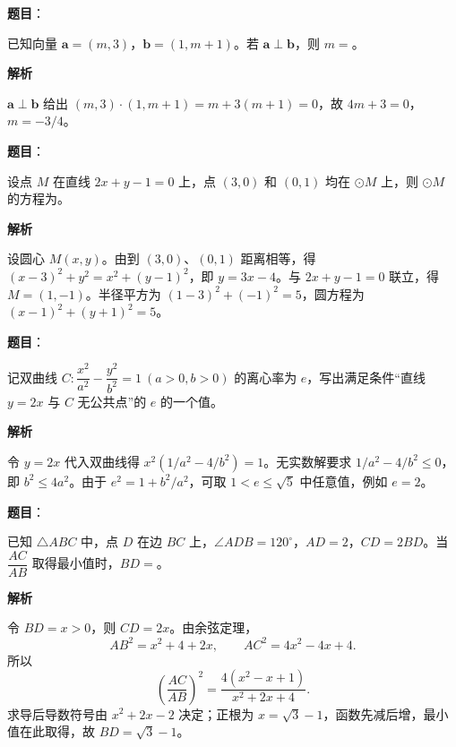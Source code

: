 \begin{answer}

\textbf{题目}：

已知向量 $\boldsymbol a=(m,3)$，$\boldsymbol b=(1,m+1)$。若 $\boldsymbol a\perp\boldsymbol b$，则 $m=$\gkblank{}。

\textbf{解析}

$\boldsymbol a\perp\boldsymbol b$ 给出
$(m,3)\cdot(1,m+1)=m+3(m+1)=0$，故 $4m+3=0$，$m=-3/4$。


\end{answer}
\begin{answer}

\textbf{题目}：

设点 $M$ 在直线 $2x+y-1=0$ 上，点 $(3,0)$ 和 $(0,1)$ 均在 $\odot M$ 上，则 $\odot M$ 的方程为\gkblank{}。

\textbf{解析}

设圆心 $M(x,y)$。由到 $(3,0)$、$(0,1)$ 距离相等，得
$(x-3)^2+y^2=x^2+(y-1)^2$，即 $y=3x-4$。与 $2x+y-1=0$ 联立，得 $M=(1,-1)$。半径平方为 $(1-3)^2+(-1)^2=5$，圆方程为 $(x-1)^2+(y+1)^2=5$。


\end{answer}
\begin{answer}

\textbf{题目}：

记双曲线 $C:\dfrac{x^2}{a^2}-\dfrac{y^2}{b^2}=1\ (a>0,b>0)$ 的离心率为 $e$，写出满足条件“直线 $y=2x$ 与 $C$ 无公共点”的 $e$ 的一个值\gkblank{}。

\textbf{解析}

令 $y=2x$ 代入双曲线得 $x^2(1/a^2-4/b^2)=1$。无实数解要求 $1/a^2-4/b^2\leq0$，即 $b^2\leq4a^2$。由于 $e^2=1+b^2/a^2$，可取 $1<e\leq\sqrt5$ 中任意值，例如 $e=2$。


\end{answer}
\begin{answer}

\textbf{题目}：

已知 $\triangle ABC$ 中，点 $D$ 在边 $BC$ 上，$\angle ADB=120^\circ$，$AD=2$，$CD=2BD$。当 $\dfrac{AC}{AB}$ 取得最小值时，$BD=$\gkblank{}。

\textbf{解析}

令 $BD=x>0$，则 $CD=2x$。由余弦定理，
\nopagebreak[4]
\[AB^2=x^2+4+2x,\qquad AC^2=4x^2-4x+4.\]
所以
\nopagebreak[4]
\[\left(\frac{AC}{AB}\right)^2
=\frac{4(x^2-x+1)}{x^2+2x+4}.\]
求导后导数符号由 $x^2+2x-2$ 决定；正根为 $x=\sqrt3-1$，函数先减后增，最小值在此取得，故 $BD=\sqrt3-1$。


\end{answer}

